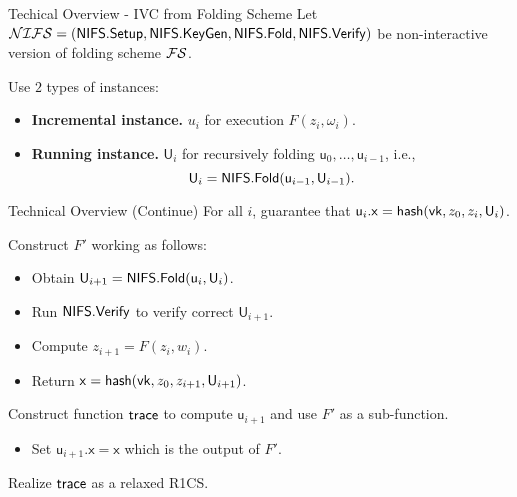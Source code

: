 \begin{frame}{Techical Overview - IVC from Folding Scheme}
	Let $\mathcal{NIFS} = (\mathsf{NIFS.Setup}, \mathsf{NIFS.KeyGen}, \mathsf{NIFS.Fold}, \mathsf{NIFS.Verify})$ be non-interactive version of folding scheme $\mathcal{FS}$.
	
	Use $2$ types of instances:
	\begin{itemize}
		\item \textbf{Incremental instance.} $u_i$ for execution $F(z_i, \omega_i)$.
		\item \textbf{Running instance.} $\mathsf{U}_i$ for recursively folding $\mathsf{u}_0, \dots, \mathsf{u}_{i - 1}$, i.e.,
		\begin{equation*}
			\mathsf{U}_i = \mathsf{NIFS.Fold}(\mathsf{u}_{i - 1}, \mathsf{U}_{i - 1}).
		\end{equation*}
	\end{itemize}
\end{frame}
\begin{frame}{Technical Overview (Continue)}
	For all $i$, guarantee that $\mathsf{u}_i.\mathsf{x} = \mathsf{hash}(\mathsf{vk}, z_0, z_{i}, \mathsf{U}_i)$.
	
	Construct $F'$ working as follows:
	\begin{itemize}
		\item Obtain $\mathsf{U}_{i + 1} = \mathsf{NIFS.Fold}(\mathsf{u}_i, \mathsf{U}_i)$.
		\item Run $\mathsf{NIFS.Verify}$ to verify correct $\mathsf{U}_{i + 1}$.
		\item Compute $z_{i + 1} = F(z_i, w_i)$.
		\item Return $\mathsf{x} = \mathsf{hash}(\mathsf{vk}, z_0, z_{i+1}, \mathsf{U}_{i+1})$.
	\end{itemize}
	
	Construct function $\mathsf{trace}$ to compute $\mathsf{u}_{i + 1}$ and use $F'$ as a sub-function.  
	\begin{itemize}
		\item Set $\mathsf{u}_{i+1}.\mathsf{x} = \mathsf{x}$ which is the output of $F'$.
	\end{itemize}
	
	Realize $\mathsf{trace}$ as a relaxed R1CS.
\end{frame}